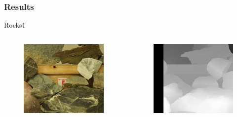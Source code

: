 \documentclass{beamer}
\begin{document}
\begin{frame}
\frametitle{Results}
Rocks1
\begin{columns}[c] %

\begin{figure}
\includegraphics[width=0.7\linewidth]{../program/dataset/Rocks1/view1.png}
\end{figure}

\begin{figure}
\includegraphics[width=0.7\linewidth]{../program/Result/Rocks1.png}
\end{figure}

\end{columns}
\end{frame}

\end{document}
